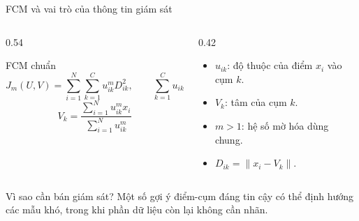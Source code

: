 \documentclass[t,aspectratio=169]{beamer}
\begin{document}
\begin{frame}{FCM và vai trò của thông tin giám sát}
  \begin{columns}[T,onlytextwidth]
    \begin{column}{0.54\textwidth}
      \begin{block}{FCM chuẩn}
        \[
          J_m(U,V)=\sum_{i=1}^{N}\sum_{k=1}^{C}u_{ik}^{m}D_{ik}^{2},
          \qquad \sum_{k=1}^{C}u_{ik}=1
        \]
        \[
          V_k=\frac{\sum_{i=1}^{N}u_{ik}^{m}x_i}
          {\sum_{i=1}^{N}u_{ik}^{m}}
        \]
      \end{block}
    \end{column}
    \begin{column}{0.42\textwidth}
      \begin{itemize}
        \item $u_{ik}$: độ thuộc của điểm $x_i$ vào cụm $k$.
        \item $V_k$: tâm của cụm $k$.
        \item $m>1$: hệ số mờ hóa dùng chung.
        \item $D_{ik}=\lVert x_i-V_k\rVert$.
      \end{itemize}
    \end{column}
  \end{columns}

  \vspace{0.3em}
  \begin{alertblock}{Vì sao cần bán giám sát?}
    Một số gợi ý điểm-cụm đáng tin cậy có thể định hướng các mẫu khó, trong khi phần dữ liệu còn lại không cần nhãn.
  \end{alertblock}
\end{frame}
\end{document}
